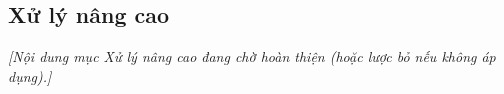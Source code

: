 
\subsection{Xử lý nâng cao}\label{subsec:xu-ly-nang-cao}

\textit{[Nội dung mục Xử lý nâng cao đang chờ hoàn thiện (hoặc lược bỏ nếu không áp dụng).]}
